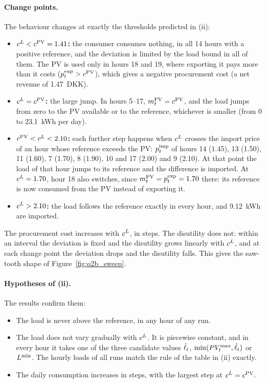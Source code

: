 \paragraph{Change points.}
The behaviour changes at exactly the thresholds predicted in (ii):
\begin{itemize}
    \item \textbf{$c^{L} < c^{\mathrm{PV}} = 1.41$:} the consumer consumes nothing, in all 14 hours with a
    positive reference, and the deviation is limited by the load bound in all of them. The PV is
    used only in hours 18 and 19, where exporting it pays more than it costs
    ($p^{\mathrm{exp}}_{t} > c^{\mathrm{PV}}$), which gives a negative procurement cost (a net revenue of 1.47~DKK).
    \item \textbf{$c^{L} = c^{\mathrm{PV}}$:} the large jump. In hours 5--17, $m^{\mathrm{PV}}_{t} = c^{\mathrm{PV}}$, and the load jumps
    from zero to the PV available or to the reference, whichever is smaller (from 0 to
    23.1~kWh per day).
    \item \textbf{$c^{\mathrm{PV}} < c^{L} < 2.10$:} each further step happens when $c^{L}$ crosses the import
    price of an hour whose reference exceeds the PV: $p^{\mathrm{imp}}_{t}$ of hours 14 (1.45), 13 (1.50),
    11 (1.60), 7 (1.70), 8 (1.90), 10 and 17 (2.00) and 9 (2.10). At that point the load of that
    hour jumps to its reference and the difference is imported. At $c^{L} = 1.70$, hour 18 also
    switches, since $m^{\mathrm{PV}}_{t} = p^{\mathrm{exp}}_{t} = 1.70$ there: its reference is now consumed from the PV instead
    of exporting it.
    \item \textbf{$c^{L} > 2.10$:} the load follows the reference exactly in every hour, and
    9.12~kWh are imported.
\end{itemize}
The procurement cost increases with $c^{L}$, in steps. The disutility does not: within an
interval the deviation is fixed and the disutility grows linearly with $c^{L}$, and at each change
point the deviation drops and the disutility falls. This gives the saw-tooth shape of
Figure~\ref{fig:q2b_sweep}.

\paragraph{Hypotheses of (ii).}
The results confirm them:
\begin{itemize}
    \item The load is never above the reference, in any hour of any run.
    \item The load does not vary gradually with $c^{L}$. It is piecewise constant, and in every hour
    it takes one of the three candidate values $\hat{\ell}_{t}$, $\min(PV_{t}^{\max}, \hat{\ell}_{t})$ or $L^{\min}$. The
    hourly loads of all runs match the rule of the table in (ii) exactly.
    \item The daily consumption increases in steps, with the largest step at $c^{L} = c^{\mathrm{PV}}$.
\end{itemize}

